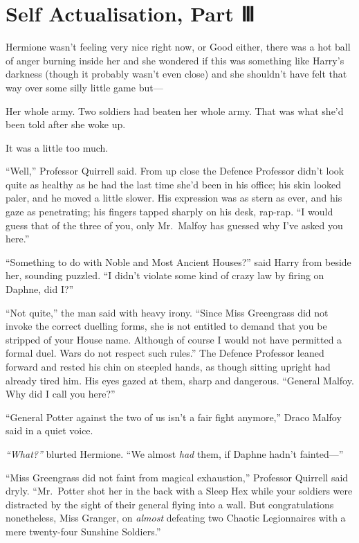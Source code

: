 \chapter{Self Actualisation, Part Ⅲ}

Hermione wasn't feeling very nice right now, or Good either, there was a
hot ball of anger burning inside her and she wondered if this was
something like Harry's darkness (though it probably wasn't even close)
and she shouldn't have felt that way over some silly little game but---

Her whole army. Two soldiers had beaten her whole army. That was what
she'd been told after she woke up.

It was a little too much.

``Well,'' Professor Quirrell said. From up close the Defence Professor
didn't look quite as healthy as he had the last time she'd been in his
office; his skin looked paler, and he moved a little slower. His
expression was as stern as ever, and his gaze as penetrating; his
fingers tapped sharply on his desk, rap-rap. ``I would guess that of the
three of you, only Mr.~Malfoy has guessed why I've asked you here.''

``Something to do with Noble and Most Ancient Houses?'' said Harry from
beside her, sounding puzzled. ``I didn't violate some kind of crazy law
by firing on Daphne, did I?''

``Not quite,'' the man said with heavy irony. ``Since Miss Greengrass
did not invoke the correct duelling forms, she is not entitled to demand
that you be stripped of your House name. Although of course I would not
have permitted a formal duel. Wars do not respect such rules.'' The
Defence Professor leaned forward and rested his chin on steepled hands,
as though sitting upright had already tired him. His eyes gazed at them,
sharp and dangerous. ``General Malfoy. Why did I call you here?''

``General Potter against the two of us isn't a fair fight anymore,''
Draco Malfoy said in a quiet voice.

\emph{``What?''} blurted Hermione. ``We almost \emph{had} them, if
Daphne hadn't fainted---''

``Miss Greengrass did not faint from magical exhaustion,'' Professor
Quirrell said dryly. ``Mr.~Potter shot her in the back with a Sleep Hex
while your soldiers were distracted by the sight of their general flying
into a wall. But congratulations nonetheless, Miss Granger, on
\emph{almost} defeating two Chaotic Legionnaires with a mere twenty-four
Sunshine Soldiers.''

